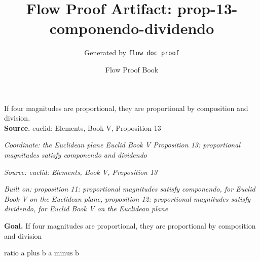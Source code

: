 \documentclass[11pt]{article}
\title{Flow Proof Artifact: prop-13-componendo-dividendo}
\author{Generated by \texttt{flow doc proof}}
\date{Flow Proof Book}
\theoremstyle{definition}
\begin{document}
\maketitle
If four magnitudes are proportional, they are proportional by composition and division.\\[0.5em]
\textbf{Source.} euclid: Elements, Book V, Proposition 13\\[0.5em]
\bigskip
{}\par
\smallskip\noindent\textit{Coordinate: the Euclidean plane \cdot Euclid Book V \cdot Proposition 13: proportional magnitudes satisfy componendo and dividendo}\par
\smallskip\noindent\textit{Source: euclid: Elements, Book V, Proposition 13}\par
\smallskip\noindent\textit{Built on: proposition 11: proportional magnitudes satisfy componendo, for Euclid Book V on the Euclidean plane, proposition 12: proportional magnitudes satisfy dividendo, for Euclid Book V on the Euclidean plane}\par
\medskip
\noindent\textbf{Goal.} If four magnitudes are proportional, they are proportional by composition and division\par
\noindent$\displaystyle \text{ratio a plus b a minus b}$\par
\medskip
\noindent
\end{document}
